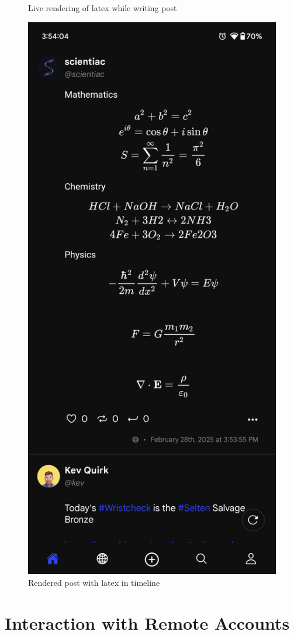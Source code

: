 \begin{figure}[htbp]
\begin{minipage}[b]{0.45\linewidth}
    \caption{Live rendering of latex while writing post}
  \end{minipage}
  \hfill %
  \begin{minipage}[b]{0.45\linewidth}
    \centering
    \includegraphics[width=\linewidth]{Graphics/postintimeline.png}
    \caption{Rendered post with latex in timeline}
  \end{minipage}
\end{figure}

\clearpage

\section{Interaction with Remote Accounts}


